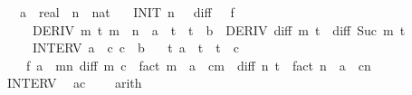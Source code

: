 \begin{isabellebody}
\ \ \ a\ {\isacharcolon}{\kern0pt}{\isacharcolon}{\kern0pt}\ real\ \ n\ {\isacharcolon}{\kern0pt}{\isacharcolon}{\kern0pt}\ nat\isanewline
\ \ \ INIT{\isacharcolon}{\kern0pt}\ {\isachardoublequoteopen}n\ {\isachargreater}{\kern0pt}\ {}{\isachardoublequoteclose}\ {\isachardoublequoteopen}diff\ {}\ {\isacharequal}{\kern0pt}\ f{\isachardoublequoteclose}\isanewline
\ \ \ \ \ DERIV{\isacharcolon}{\kern0pt}\ {\isachardoublequoteopen}{\isacharparenleft}{\kern0pt}{\isasymforall}m\ t{\isachardot}{\kern0pt}\ m\ {\isacharless}{\kern0pt}\ n\ {\isasymand}\ a\ {\isasymle}\ t\ {\isasymand}\ t\ {\isasymle}\ b\ {\isasymlongrightarrow}\ DERIV\ {\isacharparenleft}{\kern0pt}diff\ m{\isacharparenright}{\kern0pt}\ t\ {\isacharcolon}{\kern0pt}{\isachargreater}{\kern0pt}\ diff\ {\isacharparenleft}{\kern0pt}Suc\ m{\isacharparenright}{\kern0pt}\ t{\isacharparenright}{\kern0pt}{\isachardoublequoteclose}\isanewline
\ \ \ \ \ INTERV{\isacharcolon}{\kern0pt}\ {\isachardoublequoteopen}a\ {\isacharless}{\kern0pt}\ c{\isachardoublequoteclose}\ {\isachardoublequoteopen}c\ {\isasymle}\ b{\isachardoublequoteclose}\isanewline
\ \ \ {\isachardoublequoteopen}{\isasymexists}t{\isachardot}{\kern0pt}\ a\ {\isacharless}{\kern0pt}\ t\ {\isasymand}\ t\ {\isacharless}{\kern0pt}\ c\ {\isasymand}\isanewline
\ \ \ \ f\ a\ {\isacharequal}{\kern0pt}\ {\isacharparenleft}{\kern0pt}{\isasymSum}m{\isacharless}{\kern0pt}n{\isachardot}{\kern0pt}\ {\isacharparenleft}{\kern0pt}diff\ m\ c\ {\isacharslash}{\kern0pt}\ fact\ m{\isacharparenright}{\kern0pt}\ {\isacharasterisk}{\kern0pt}\ {\isacharparenleft}{\kern0pt}a\ {\isacharminus}{\kern0pt}\ c{\isacharparenright}{\kern0pt}{\isacharcircum}{\kern0pt}m{\isacharparenright}{\kern0pt}\ {\isacharplus}{\kern0pt}\ {\isacharparenleft}{\kern0pt}diff\ n\ t\ {\isacharslash}{\kern0pt}\ fact\ n{\isacharparenright}{\kern0pt}\ {\isacharasterisk}{\kern0pt}\ {\isacharparenleft}{\kern0pt}a\ {\isacharminus}{\kern0pt}\ c{\isacharparenright}{\kern0pt}{\isacharcircum}{\kern0pt}n{\isachardoublequoteclose}\isanewline
%
\isadelimproof
%
\endisadelimproof
%
\isatagproof
{}\isamarkupfalse%
\ {\isacharminus}{\kern0pt}\isanewline
\ \ \isamarkupfalse%
\ INTERV\ \isamarkupfalse%
\ {\isachardoublequoteopen}a{\isacharminus}{\kern0pt}c\ {\isacharless}{\kern0pt}\ {}{\isachardoublequoteclose}\ \isamarkupfalse%
\ arith\isanewline
\ \ \isamarkupfalse%
\ \isamarkupfalse%

\end{isabellebody}
